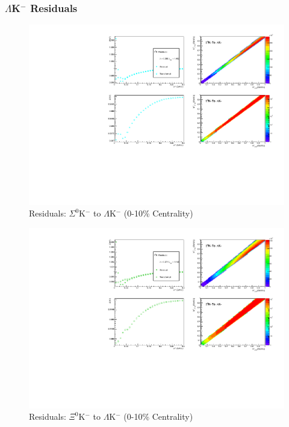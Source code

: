 \documentclass[../AnalysisNoteJBuxton.tex]{subfiles}
\begin{document}
\subsubsection{\texorpdfstring{$\Lambda$K$^{-}$}{TEXT} Residuals}
\label{Residuals_LamKchM}

\begin{figure}[h]
  \centering
  \includegraphics[width=\textwidth]{9_AdditionalFigures/Figures/Residuals/LamKchM/Residuals_LamKchM_0010_Sig0KchM_MomResCrctn_NonFlatBgdCrctn_ResidualsIncluded_UsingCoulombOnlyInterpCfs.pdf}
  \caption[Residuals: $\Sigma^{0}$K$^{-}$ to $\Lambda$K$^{-}$ (0-10\% Centrality)]{Residuals: $\Sigma^{0}$K$^{-}$ to $\Lambda$K$^{-}$ (0-10\% Centrality)}
  \label{fig:Res_LamKchM_0010_Sig0KchM}
\end{figure}


\begin{figure}[h]
  \centering
  \includegraphics[width=\textwidth]{9_AdditionalFigures/Figures/Residuals/LamKchM/Residuals_LamKchM_0010_Xi0KchM_MomResCrctn_NonFlatBgdCrctn_ResidualsIncluded_UsingCoulombOnlyInterpCfs.pdf}
  \caption[Residuals: $\Xi^{0}$K$^{-}$ to $\Lambda$K$^{-}$ (0-10\% Centrality)]{Residuals: $\Xi^{0}$K$^{-}$ to $\Lambda$K$^{-}$ (0-10\% Centrality)}
  \label{fig:Res_LamKchM_0010_Xi0KchM}
\end{figure}
\end{document}
